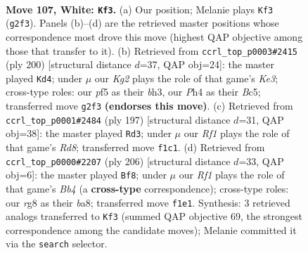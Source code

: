 \documentclass[11pt]{article}
\begin{document}
\clearpage

\begin{figure}[p]\centering
\begin{subfigure}{0.46\textwidth}\centering
\resizebox{\linewidth}{!}{%
\newchessgame
\chessboard[
  setfen={6r1/2k5/p7/P1p2p1p/1p3P1P/1P2P1P1/6K1/5R2 w - - 1 107},
  showmover=false,
  pgfstyle=straightmove, color=movearrow, markmove={g2-f3}
]}
\caption{}
\end{subfigure}\hfill
\begin{subfigure}{0.46\textwidth}\centering
\resizebox{\linewidth}{!}{%
\newchessgame
\chessboard[
  setfen={6k1/8/4rpp1/2B4p/4P2P/4KPPb/1R6/8 w - - 35 101},
  showmover=false,
  pgfstyle=straightmove, color=movearrow, markmove={e3-d4}
]}
\caption{}
\end{subfigure}
\\[4pt]
\begin{subfigure}{0.46\textwidth}\centering
\resizebox{\linewidth}{!}{%
\newchessgame
\chessboard[
  setfen={8/1R3pk1/4p1p1/6Pp/4P2P/5P1K/8/3r4 b - - 86 99},
  showmover=false,
  pgfstyle=straightmove, color=movearrow, markmove={d1-d3}
]}
\caption{}
\end{subfigure}\hfill
\begin{subfigure}{0.46\textwidth}\centering
\resizebox{\linewidth}{!}{%
\newchessgame
\chessboard[
  setfen={b7/5p1p/4p3/4PpP1/pB3P2/P2k2P1/5K2/8 w - - 88 104},
  showmover=false,
  pgfstyle=straightmove, color=movearrow, markmove={b4-f8}
]}
\caption{}
\end{subfigure}
\caption{\textbf{Move 107, White: \texttt{Kf3}.} (a) Our position; Melanie plays \texttt{Kf3} (\texttt{g2f3}). Panels (b)--(d) are the retrieved master positions whose correspondence most drove this move (highest QAP objective among those that transfer to it). (b) Retrieved from \texttt{ccrl\_top\_p0003\#2415} (ply 200) [structural distance $d$=37, QAP obj=24]: the master played \texttt{Kd4}; under $\mu$ our \emph{Kg2} plays the role of that game's \emph{Ke3}; cross-type roles: our \emph{p}f5 as their \emph{b}h3, our \emph{P}h4 as their \emph{B}c5; transferred move \texttt{g2f3} \textbf{(endorses this move)}. (c) Retrieved from \texttt{ccrl\_top\_p0001\#2484} (ply 197) [structural distance $d$=31, QAP obj=38]: the master played \texttt{Rd3}; under $\mu$ our \emph{Rf1} plays the role of that game's \emph{Rd8}; transferred move \texttt{f1c1}. (d) Retrieved from \texttt{ccrl\_top\_p0000\#2207} (ply 206) [structural distance $d$=33, QAP obj=6]: the master played \texttt{Bf8}; under $\mu$ our \emph{Rf1} plays the role of that game's \emph{Bb4} (a \textbf{cross-type} correspondence); cross-type roles: our \emph{r}g8 as their \emph{b}a8; transferred move \texttt{f1e1}. Synthesis: 3 retrieved analogs transferred to \texttt{Kf3} (summed QAP objective 69, the strongest correspondence among the candidate moves); Melanie committed it via the \texttt{search} selector.}
\label{fig:thought-m212}
\end{figure}
\end{document}
